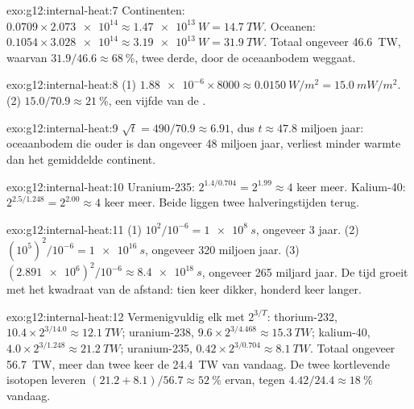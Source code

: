 \begin{solution}{exo:g12:internal-heat:7}
Continenten: $0.0709 \times \num{2.073e14} \approx \qty{1.47e13}{W} =
\qty{14.7}{TW}$. Oceanen: $0.1054 \times \num{3.028e14} \approx
\qty{3.19e13}{W} = \qty{31.9}{TW}$. Totaal ongeveer \qty{46.6}{TW}, waarvan
$31.9/46.6 \approx \qty{68}{\percent}$, twee derde, door de oceaanbodem
weggaat.
\end{solution}

\begin{solution}{exo:g12:internal-heat:8}
(1) $\num{1.88e-6} \times 8000 \approx \qty{0.0150}{W/m^2} = \qty{15.0}{mW/m^2}$.
(2) $15.0/70.9 \approx \qty{21}{\percent}$, een vijfde van de .
\end{solution}

\begin{solution}{exo:g12:internal-heat:9}
$\sqrt{t} = 490/70.9 \approx 6.91$, dus $t \approx 47.8$ miljoen jaar: oceaanbodem
die ouder is dan ongeveer 48 miljoen jaar, verliest minder warmte dan het gemiddelde
continent.
\end{solution}

\begin{solution}{exo:g12:internal-heat:10}
Uranium-235: $2^{1.4/0.704} = 2^{1.99} \approx 4$ keer meer. Kalium-40:
$2^{2.5/1.248} = 2^{2.00} \approx 4$ keer meer. Beide liggen twee halveringstijden terug.
\end{solution}

\begin{solution}{exo:g12:internal-heat:11}
(1) $10^2/10^{-6} = \qty{1e8}{s}$, ongeveer 3 jaar. (2) $(10^5)^2/10^{-6} =
\qty{1e16}{s}$, ongeveer 320 miljoen jaar. (3) $(\num{2.891e6})^2/10^{-6}
\approx \qty{8.4e18}{s}$, ongeveer 265 miljard jaar. De tijd groeit met het
kwadraat van de afstand: tien keer dikker, honderd keer langer.
\end{solution}

\begin{solution}{exo:g12:internal-heat:12}
Vermenigvuldig elk met $2^{3/T}$: thorium-232, $10.4 \times 2^{3/14.0} \approx
\qty{12.1}{TW}$; uranium-238, $9.6 \times 2^{3/4.468} \approx \qty{15.3}{TW}$;
kalium-40, $4.0 \times 2^{3/1.248} \approx \qty{21.2}{TW}$; uranium-235,
$0.42 \times 2^{3/0.704} \approx \qty{8.1}{TW}$. Totaal ongeveer \qty{56.7}{TW},
meer dan twee keer de \qty{24.4}{TW} van vandaag. De twee kortlevende isotopen leveren
$(21.2 + 8.1)/56.7 \approx \qty{52}{\percent}$ ervan, tegen
$4.42/24.4 \approx \qty{18}{\percent}$ vandaag.
\end{solution}

